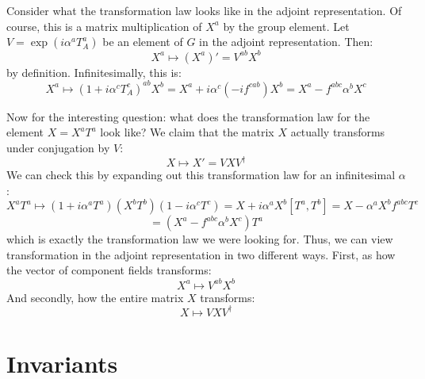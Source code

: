 \documentclass[11pt, oneside]{article}   	%
\theoremstyle{definition}
\begin{document}
Consider what the transformation law looks like in the adjoint representation. Of course, this is 
a matrix multiplication of $X^a$ by the group element. Let $V = \exp(i\alpha^a T_A^a)$ be an element of 
$G$ in the adjoint representation. Then:
\begin{equation}
	X^a\mapsto (X^a)' = V^{ab}X^b
\end{equation}
by definition. Infinitesimally, this is:
\begin{equation}
	X^a\mapsto (1 + i\alpha^c T_A^c)^{ab} X^b = X^a + i\alpha^c (-if^{cab})X^b = X^a - 
	f^{abc}\alpha^b X^c
\end{equation}

Now for the interesting question: what does the transformation law for the element $X = X^a T^a$ 
look like? We claim that the matrix $X$ actually transforms under conjugation by $V$:
\begin{equation}
	X\mapsto X' = VXV^\dagger
\end{equation}
We can check this by expanding out this transformation law for an infinitesimal $\alpha$:
$$
	X^a T^a\mapsto (1 + i\alpha^a T^a) (X^b T^b) (1 - i\alpha^c T^c) = X + i\alpha^a X^b [T^a, T^b]
	= X - \alpha^a X^bf^{abc}T^c 
$$
$$
	= (X^a - f^{abc}\alpha^b X^c)T^a
$$
which is exactly the transformation law we were looking for. Thus, we can view transformation in the 
adjoint representation in two different ways. First, as how the vector of component fields transforms:
\begin{equation}
	X^a\mapsto V^{ab} X^b
\end{equation}
And secondly, how the entire matrix $X$ transforms:
\begin{equation}
	X\mapsto VXV^\dagger
\end{equation}

\section{Invariants}
\end{document}
